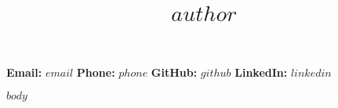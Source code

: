\documentclass[11pt,a4paper]{article}
\title{\textcolor{devblue}{\large $author$}}
\author{}
\date{}
\begin{document}
\maketitle

\vspace{-1em}
\noindent\textbf{Email:} \href{mailto:$email$}{\texttt{$email$}} \hspace{1em}
\textbf{Phone:} $phone$ \hspace{1em}
\textbf{GitHub:} \href{https://github.com/$github$}{\texttt{$github$}} \hspace{1em}
\textbf{LinkedIn:} \href{https://linkedin.com/in/$linkedin$}{\texttt{$linkedin$}}

\vspace{1em}

$body$
\end{document}
